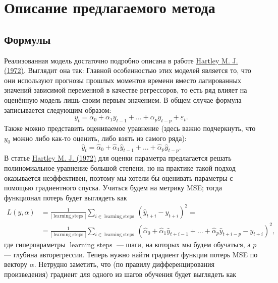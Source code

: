 \documentclass[a4paper,14pt]{extarticle}
\newcommand{\bibref}[3]{\hyperlink{#1}{#2 (#3)}} %
\begin{document}
\section{Описание предлагаемого метода}
\subsection{Формулы}
	Реализованная модель достаточно подробно описана в работе \bibref{hartley72}{Hartley M. J.}{1972}. Выглядит она так:
	Главной особенностью этих моделей является то, что они используют прогнозы прошлых моментов времени вместо лагированных значений зависимой переменной в качестве регрессоров, то есть ряд влияет на оценённую модель лишь своим первым значением. В общем случае формула записывается следующим образом:
	\begin{equation*}
		y_t = \alpha_0 + \alpha_1 y_{t-1} + \dots + \alpha_p y_{t-p} + \varepsilon_t.
	\end{equation*}
	Также можно представить оцениваемое уравнение (здесь важно подчеркнуть, что $y_0$ можно либо как-то оценить, либо взять из самого ряда):
	\begin{equation*}
		\hat{y}_t = \hat{\alpha}_0 + \hat{\alpha}_1 \hat{y}_{t-1} + \dots + \hat{\alpha}_p \hat{y}_{t-p}.
	\end{equation*}
	В статье \bibref{hartley72}{Hartley M. J.}{1972} для оценки параметра предлагается решать полиномиальное уравнение большой степени, но на практике такой подход оказывается неэффективен, поэтому мы хотели бы оценивать параметры с помощью градиентного спуска. Учиться будем на метрику MSE; тогда функционал потерь будет выглядеть как 
	\begin{align*}
		L(y, \alpha) &= \frac{1}{|\operatorname{learning\_steps}|}\sum_{i \in \operatorname{learning\_steps}} (\hat{y}_{t + i} - y_{t + i})^2 = \\ &= \frac{1}{|\operatorname{learning\_steps}|}\sum_{i \in \operatorname{learning\_steps}} (\hat{\alpha}_0 + \hat{\alpha}_1 \hat{y}_{t+i-1} + \dots + \hat{\alpha}_p \hat{y}_{t+i-p} - y_{t + i})^2,
	\end{align*}
	где гиперпараметры $\operatorname{learning\_steps}$ --- шаги, на которых мы будем обучаться, а $p$ --- глубина авторегрессии. Теперь нужно найти градиент функции потерь MSE по вектору $\alpha$. Нетрудно заметить, что (по правилу дифференцирования произведения) градиент для одного из шагов обучения будет выглядеть как 
\end{document}
